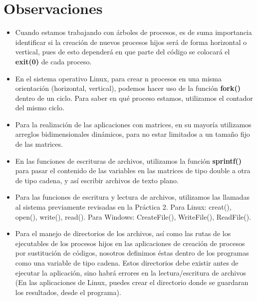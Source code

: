 \documentclass[12pt]{article}
\begin{document}
    \section{Observaciones}
        \begin{itemize}
            \item[\Checkmark] Cuando estamos trabajando con árboles de procesos, es de suma importancia identificar si la creación de nuevos procesos hijos será de forma horizontal o vertical, pues de esto dependerá en que parte del código se colocará el \textbf{exit(0)} de cada proceso.
        
            \item[\Checkmark] En el sistema operativo Linux, para crear n procesos en una misma orientación (horizontal, vertical), podemos hacer uso de la función \textbf{fork()} dentro de un ciclo. Para saber en qué proceso estamos, utilizamos el contador del mismo ciclo.
            
            \item[\Checkmark] Para la realización de las aplicaciones con matrices, en su mayoría utilizamos arreglos bidimensionales dinámicos, para no estar limitados a un tamaño fijo de las matrices.
            
            \item[\Checkmark] En las funciones de escrituras de archivos, utilizamos la función \textbf{sprintf()} para pasar el contenido de las variables en las matrices de tipo double a otra de tipo cadena, y así escribir archivos de texto plano.
            
            \item[\Checkmark] Para las funciones de escritura y lectura de archivos, utilizamos las llamadas al sistema previamente revisadas en la Práctica 2. Para Linux: creat(), open(), write(), read(). Para Windows: CreateFile(), WriteFile(), ReadFile().
            
            \item[\Checkmark] Para el manejo de directorios de los archivos, así como las rutas de los ejecutables de los procesos hijos en las aplicaciones de creación de procesos por sustitución de códigos, nosotros definimos éstas dentro de los programas como una variable de tipo cadena. Estos directorios debe existir antes de ejecutar la aplicación, sino habrá errores en la lectura/escritura de archivos (En las aplicaciones de Linux, puedes crear el directorio donde se guardaran los resultados, desde el programa).
            

\end{itemize}
\end{document}
